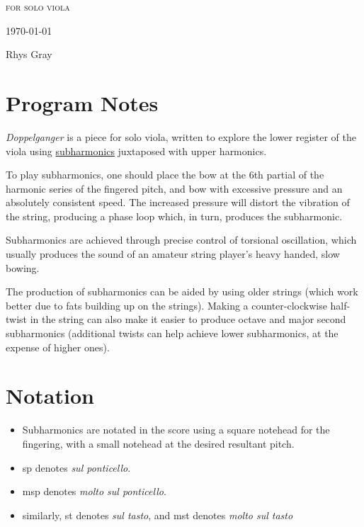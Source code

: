 
\invisiblechapter{\violaPiece}

\vspace{3.8cm}

\begin{center}

\textsc{for solo viola}

\vspace{2.8cm}

\HRule{0.5pt}

\LARGE \textbf{\uppercase{\violaPiece}}

\HRule{2pt}

\vspace{1.8cm}

\normalsize \today

\vspace{3.8cm}

Rhys Gray

\end{center}
\newpage

\section*{Program Notes}
\emph{Doppelganger} is a piece for solo viola, written to explore the lower register of the viola using \hyperref[sec:subharmonics]{subharmonics} juxtaposed with upper harmonics. 

To play subharmonics, one should place the bow at the 6th partial of the harmonic series of the fingered pitch, and bow with excessive pressure and an absolutely consistent speed. 
The increased pressure will distort the vibration of the string, producing a phase loop which, in turn, produces the subharmonic. 

Subharmonics are achieved through precise control of torsional oscillation, which usually produces the sound of an amateur string player's heavy handed, slow bowing. 

The production of subharmonics can be aided by using older strings (which work better due to fats building up on the strings). 
Making a counter-clockwise half-twist in the string can also make it easier to produce octave and major second subharmonics (additional twists can help achieve lower subharmonics, at the expense of higher ones).

\section*{Notation}
\begin{itemize}

    \item Subharmonics are notated in the score using a square notehead for the fingering, with a small notehead at the desired resultant pitch.
    \item sp denotes \emph{sul ponticello}.
    \item msp denotes \emph{molto sul ponticello}.
    \item similarly, st denotes \emph{sul tasto}, and mst denotes \emph{molto sul tasto}
\end{itemize}

\newpage

% 
\label{app:doppelganger Score}

